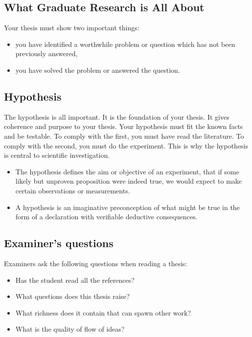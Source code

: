 \subsection*{What Graduate Research is All About}
Your thesis must show two important things:

\begin{itemize}
	\item you have identified a worthwhile problem or question which has not been previously 
	answered,
	\item you have solved the problem or answered the question.
\end{itemize}

\subsection*{Hypothesis}
The hypothesis is all important. It is the foundation of your thesis. It gives coherence
and purpose to your thesis. Your hypothesis must fit the known facts and be testable.
To comply with the first, you must have read the literature. To comply with the second, you must do
the experiment. This is why the hypothesis is central to scientific investigation.

\begin{itemize}
	\item The hypothesis defines the aim or objective of an experiment, that if some likely but
unproven proposition were indeed true, we would expect to make certain observations or measurements.
	\item A hypothesis is an imaginative preconception of what might be true in the form of
a declaration with verifiable deductive consequences.
\end{itemize}

\subsection{Examiner's questions}
Examiners ask the following questions when reading a thesis:

\begin{itemize}
  \item Has the student read all the references?
  \item What questions does this thesis raise?
  \item What richness does it contain that can spawn other work?
  \item What is the quality of flow of ideas?
\end{itemize}